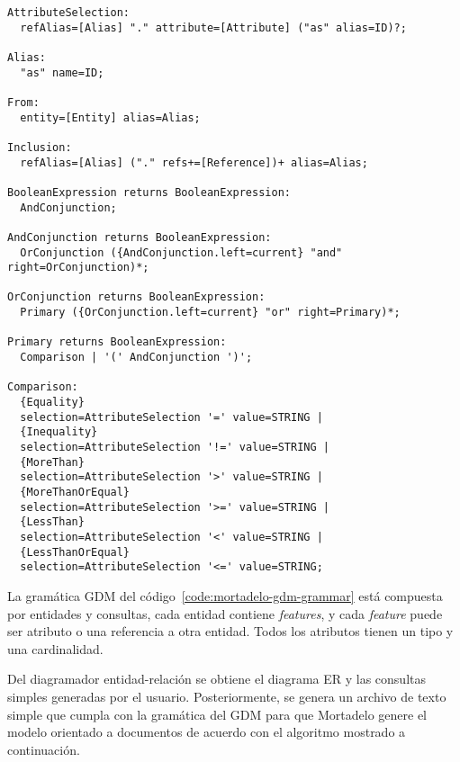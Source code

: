 \begin{code}
\begin{verbatim}
AttributeSelection:
  refAlias=[Alias] "." attribute=[Attribute] ("as" alias=ID)?;

Alias:
  "as" name=ID;

From:
  entity=[Entity] alias=Alias;

Inclusion:
  refAlias=[Alias] ("." refs+=[Reference])+ alias=Alias;

BooleanExpression returns BooleanExpression:
  AndConjunction;

AndConjunction returns BooleanExpression:
  OrConjunction ({AndConjunction.left=current} "and" right=OrConjunction)*;

OrConjunction returns BooleanExpression:
  Primary ({OrConjunction.left=current} "or" right=Primary)*;

Primary returns BooleanExpression:
  Comparison | '(' AndConjunction ')';

Comparison:
  {Equality}
  selection=AttributeSelection '=' value=STRING |
  {Inequality}
  selection=AttributeSelection '!=' value=STRING |
  {MoreThan}
  selection=AttributeSelection '>' value=STRING |
  {MoreThanOrEqual}
  selection=AttributeSelection '>=' value=STRING |
  {LessThan}
  selection=AttributeSelection '<' value=STRING |
  {LessThanOrEqual}
  selection=AttributeSelection '<=' value=STRING;
\end{verbatim}
\end{code}

La gramática GDM del código~\ref{code:mortadelo-gdm-grammar} está compuesta por entidades y consultas, cada entidad contiene \textit{features}, y cada \textit{feature} puede ser atributo o una referencia a otra entidad. Todos los atributos tienen un tipo y una cardinalidad.

Del diagramador entidad-relación se obtiene el diagrama ER y las consultas simples generadas por el usuario. Posteriormente, se genera un archivo de texto simple que cumpla con la gramática del GDM para que Mortadelo genere el modelo orientado a documentos de acuerdo con el algoritmo mostrado a continuación.